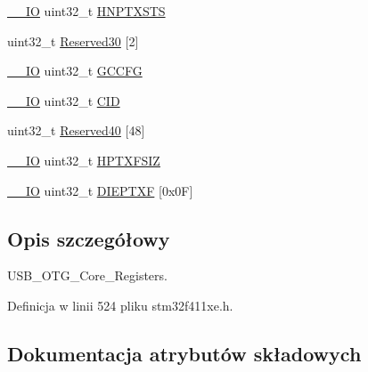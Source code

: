 \begin{DoxyCompactItemize}
\item 
\hyperlink{core__sc300_8h_aec43007d9998a0a0e01faede4133d6be}{\+\_\+\+\_\+\+IO} uint32\+\_\+t \hyperlink{struct_u_s_b___o_t_g___global_type_def_a99c998f37e7a88a26f22defb10a1e83a}{H\+N\+P\+T\+X\+S\+TS}
\item 
uint32\+\_\+t \hyperlink{struct_u_s_b___o_t_g___global_type_def_a978a73c27d2afe65def81f28b881e138}{Reserved30} \mbox{[}2\mbox{]}
\item 
\hyperlink{core__sc300_8h_aec43007d9998a0a0e01faede4133d6be}{\+\_\+\+\_\+\+IO} uint32\+\_\+t \hyperlink{struct_u_s_b___o_t_g___global_type_def_a9f94762e8ec6d3984e2da3f48bae8a7b}{G\+C\+C\+FG}
\item 
\hyperlink{core__sc300_8h_aec43007d9998a0a0e01faede4133d6be}{\+\_\+\+\_\+\+IO} uint32\+\_\+t \hyperlink{struct_u_s_b___o_t_g___global_type_def_a5c67046606b7e64fb03c4ac550156156}{C\+ID}
\item 
uint32\+\_\+t \hyperlink{struct_u_s_b___o_t_g___global_type_def_ab32b3885e27effc89f6ffe83d46ddd8e}{Reserved40} \mbox{[}48\mbox{]}
\item 
\hyperlink{core__sc300_8h_aec43007d9998a0a0e01faede4133d6be}{\+\_\+\+\_\+\+IO} uint32\+\_\+t \hyperlink{struct_u_s_b___o_t_g___global_type_def_ad50445f076f99e6b3d0cfb2643f40fac}{H\+P\+T\+X\+F\+S\+IZ}
\item 
\hyperlink{core__sc300_8h_aec43007d9998a0a0e01faede4133d6be}{\+\_\+\+\_\+\+IO} uint32\+\_\+t \hyperlink{struct_u_s_b___o_t_g___global_type_def_a8027d5b1a53306f5440506ae4915dd52}{D\+I\+E\+P\+T\+XF} \mbox{[}0x0\+F\mbox{]}
\end{DoxyCompactItemize}


\subsection{Opis szczegółowy}
U\+S\+B\+\_\+\+O\+T\+G\+\_\+\+Core\+\_\+\+Registers. 

Definicja w linii 524 pliku stm32f411xe.\+h.



\subsection{Dokumentacja atrybutów składowych}
\mbox{\label{struct_u_s_b___o_t_g___global_type_def_a5c67046606b7e64fb03c4ac550156156}} 
